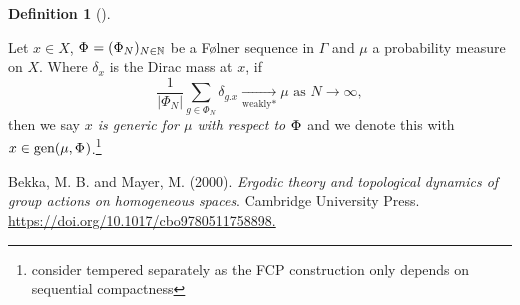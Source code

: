 \documentclass[
  british,
]{article}
\newlength{\cslhangindent}
\newenvironment{CSLReferences}[2] %
 {\begin{list}{}{%
  \setlength{\itemindent}{0pt}
  \setlength{\leftmargin}{0pt}
  \setlength{\parsep}{0pt}
  \ifodd #1
   \setlength{\leftmargin}{\cslhangindent}
   \setlength{\itemindent}{-1\cslhangindent}
  \fi
  \setlength{\itemsep}{#2\baselineskip}}}
 {\end{list}}
\theoremstyle{definition}
\newtheorem{definition}{Definition}[section]
\theoremstyle{remark}
\newcommand{\Folner}[1][\vphantom{}]{{\Phi}_{#1}}
\newcommand{\Measure}{{\mu}}
\newcommand{\GroupAction}[2]{{#1}.{#2}}
\newcommand{\GroupElement}{{g}}
\begin{document}
\begin{definition}[]\protect\hypertarget{def-generic}{}\label{def-generic}

Let \(x\in X\), \(\Folner=(\Folner[N])_{N\in\mathbb{N}}\) be a Følner
sequence in \(\Gamma\) and \(\Measure\) a probability measure on \(X\).
Where \(\delta_x\) is the Dirac mass at \(x\), if
\[\frac{1}{|\Folner[N]|}\sum_{\GroupElement\in\Folner[N]}\delta_{\GroupAction{\GroupElement}{x}}\underset{\text{weakly*}}{\longrightarrow} \Measure \text{ as }N\rightarrow\infty, \]
then we say \emph{\(x\) is generic for \(\Measure\) with respect to
\(\Folner\)} and we denote this with
\(x\in\text{gen}(\Measure,\Folner)\).\footnote{consider tempered
  separately as the FCP construction only depends on sequential
  compactness}

\end{definition}

\label{refs}
\begin{CSLReferences}{1}{0}
Bekka, M. B. and Mayer, M. (2000). \emph{Ergodic theory and topological
dynamics of group actions on homogeneous spaces}. Cambridge University
Press.
\href{https://doi.org/10.1017/cbo9780511758898}{https://doi.org/10.1017/cbo9780511758898.}

\end{CSLReferences}
\end{document}
